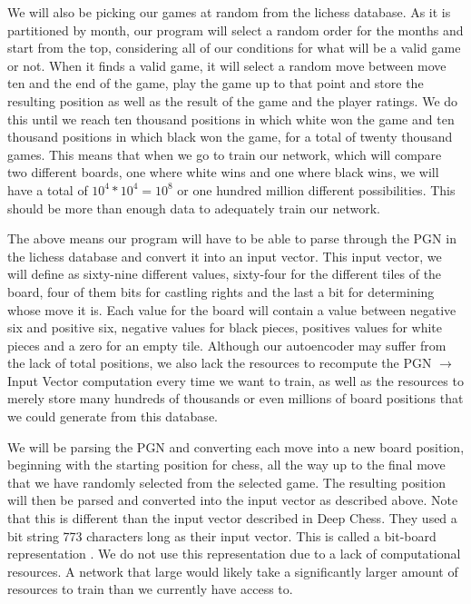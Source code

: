 \documentclass[12pt]{article}
\begin{document}
    We will also be picking our games at random from the lichess database. As it is partitioned by month, our program will select a random order for the months and start from the top, considering all of our conditions for what will be a valid game or not. When it finds a valid game, it will select a random move between move ten and the end of the game, play the game up to that point and store the resulting position as well as the result of the game and the player ratings. We do this until we reach ten thousand positions in which white won the game and ten thousand positions in which black won the game, for a total of twenty thousand games. This means that when we go to train our network, which will compare two different boards, one where white wins and one where black wins, we will have a total of $10^{4} * 10^{4} = 10^{8}$ or one hundred million different possibilities. This should be more than enough data to adequately train our network. 

    The above means our program will have to be able to parse through the PGN in the lichess database and convert it into an input vector. This input vector, we will define as sixty-nine different values, sixty-four for the different tiles of the board, four of them bits for castling rights and the last a bit for determining whose move it is. Each value for the board will contain a value between negative six and positive six, negative values for black pieces, positives values for white pieces and a zero for an empty tile. Although our autoencoder may suffer from the lack of total positions, we also lack the resources to recompute the PGN $\rightarrow$ Input Vector computation every time we want to train, as well as the resources to merely store many hundreds of thousands or even millions of board positions that we could generate from this database.
    
    We will be parsing the PGN and converting each move into a new board position, beginning with the starting position for chess, all the way up to the final move that we have randomly selected from the selected game. The resulting position will then be parsed and converted into the input vector as described above. Note that this is different than the input vector described in Deep Chess. They used a bit string 773 characters long as their input vector. This is called a bit-board representation \cite{deepchess}. We do not use this representation due to a lack of computational resources. A network that large would likely take a significantly larger amount of resources to train than we currently have access to.
\end{document}
